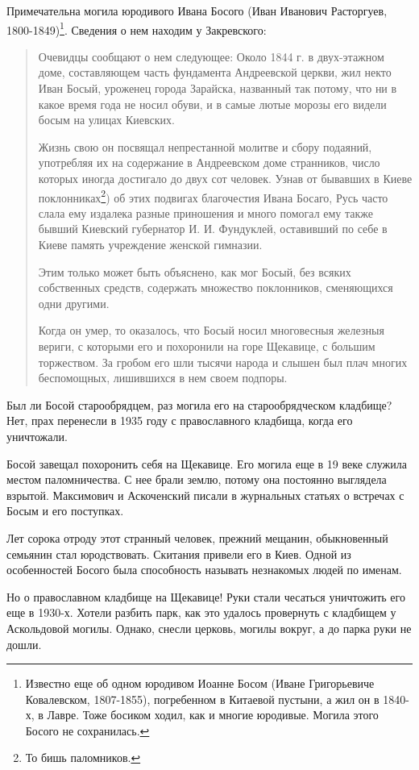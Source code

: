 Примечательна могила юродивого Ивана Босого (Иван Иванович Расторгуев, 1800-1849)\footnote{Известно еще об одном юродивом Иоанне Босом (Иване Григорьевиче Ковалевском, 1807-1855), погребенном в Китаевой пустыни, а жил он в 1840-х, в Лавре. Тоже босиком ходил, как и многие юродивые. Могила этого Босого не сохранилась.}. Сведения о нем находим у Закревского\cite{zakr01}:

\begin{quotation}
Очевидцы сообщают о нем следующее: Около 1844 г. в двух-этажном доме, составляющем часть фундамента Андреевской церкви, жил некто Иван Босый, уроженец города Зарайска, названный так потому, что ни в какое время года не носил обуви, и в самые лютые морозы его видели босым на улицах Киевских. 

Жизнь свою он посвящал непрестанной молитве и сбору подаяний, употребляя их на содержание в Андреевском доме странников, число которых иногда достигало до двух сот человек. Узнав от бывавших в Киеве поклонниках\footnote{То бишь паломников.}) об этих подвигах благочестия Ивана Босаго, Русь часто слала ему издалека разные приношения и много помогал ему также бывший Киевский губернатор И. И. Фундуклей, оставивший по себе в Киеве память учреждение женской гимназии. 

Этим только может быть объяснено, как мог Босый, без всяких собственных средств, содержать множество поклонников, сменяющихся одни другими. 

Когда он умер, то оказалось, что Босый носил многовесныя железныя вериги, с которыми его и похоронили на горе Щекавице, с большим торжеством. За гробом его шли тысячи народа и слышен был плач многих беспомощных, лишившихся в нем своем подпоры.
\end{quotation}

Был ли Босой старообрядцем, раз могила его на старообрядческом кладбище? Нет, прах перенесли в 1935 году с православного кладбища, когда его уничтожали.

Босой завещал похоронить себя на Щекавице. Его могила еще в 19 веке служила местом паломничества. С нее брали землю, потому она постоянно выглядела взрытой. Максимович и Аскоченский писали в журнальных статьях о встречах с Босым и его поступках.

Лет сорока отроду этот странный человек, прежний мещанин, обыкновенный семьянин стал юродствовать. Скитания привели его в Киев. Одной из особенностей Босого была способность называть незнакомых людей по именам. 

Но о православном кладбище на Щекавице! Руки стали чесаться уничтожить его еще в 1930-х. Хотели разбить парк, как это удалось провернуть с кладбищем у Аскольдовой могилы. Однако, снесли церковь, могилы вокруг, а до парка руки не дошли.

